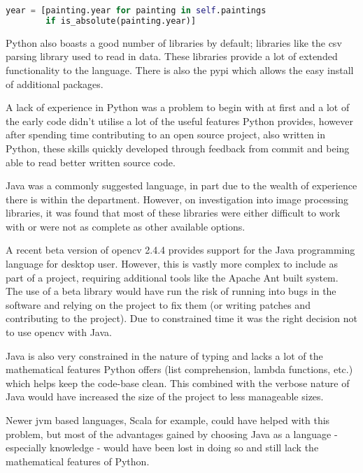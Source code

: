 \begin{lstlisting}[language=python,
caption={Example of List Comprehension in Python},
label=lst:python-list-comp]
year = [painting.year for painting in self.paintings 
        if is_absolute(painting.year)]
\end{lstlisting}

Python also boasts a good number of libraries by default; libraries like the \gls{csv} parsing 
library used to read in data. These libraries provide a lot of extended functionality to the 
language. There is also the \gls{pypi} which allows the easy install of 
additional packages.

A lack of experience in Python was a problem to begin with at first and a lot of the early code 
didn't utilise a lot of the useful features Python provides, however after spending time 
contributing to an open source project, also written in Python, these skills quickly developed 
through feedback from commit and being able to read better written source code.

Java was a commonly suggested language, in part due to the wealth of experience there is within
the department. However, on investigation into image processing libraries, it was found that most
of these libraries were either difficult to work with or were not as complete as other available
options.

A recent beta version of \gls{opencv} 2.4.4 provides support for the Java programming language
for desktop user. However, this is vastly more complex to include as part of a project, requiring
additional tools like the Apache Ant built system. The use of a beta library would have run the 
risk of running into bugs in the software and relying on the project to fix them (or writing 
patches and contributing to the project). Due to constrained time it was the right decision not to
use \gls{opencv} with Java.

Java is also very constrained in the nature of typing and lacks a lot of the mathematical features
Python offers (list comprehension, lambda functions, etc.) which helps keep the code-base clean.
This combined with the verbose nature of Java would have increased the size of the project to
less manageable sizes.

Newer \gls{jvm} based languages, Scala for example, could have helped with this problem, but most
of the advantages gained by choosing Java as a language - especially knowledge - would have been
lost in doing so and still lack the mathematical features of Python.

